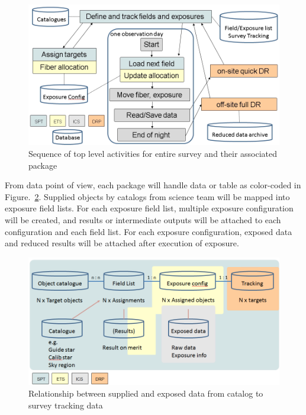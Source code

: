 \documentclass[a4paper,notitlepage]{article}
\begin{document}
\begin{figure}[htb]
  \begin{center}
    \includegraphics[width=.75\linewidth]{sciops-scireq-slide-softcoord.png}
  \end{center}
  \caption{Sequence of top level activities for entire survey and 
    their associated package}
  \label{fig:sciops-scireq-slide-softcoord}
\end{figure}

From data point of view, each package will handle data or table as
color-coded in Figure.~\ref{fig:sciops-scireq-slide-data}. Supplied
objects by catalogs from science team will be mapped into exposure
field lists. For each exposure field list, multiple exposure
configuration will be created, and results or intermediate outputs will
be attached to each configuration and each field list.  For each
exposure configuration, exposed data and reduced results will be
attached after execution of exposure.

\begin{figure}[htb]
  \begin{center}
    \includegraphics[width=.75\linewidth]{sciops-scireq-slide-data.png}
  \end{center}
  \caption{Relationship between supplied and exposed data from catalog
    to survey tracking data} \label{fig:sciops-scireq-slide-data}
\end{figure}


\clearpage
\end{document}
